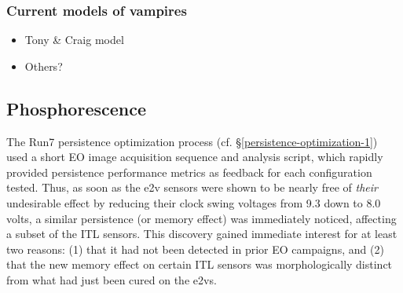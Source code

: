 \subsubsection{Current models of
vampires}\label{current-models-of-vampires}

\begin{itemize}
\tightlist
\item
  Tony \& Craig model
\item
  Others?
\end{itemize}



\subsection{Phosphorescence}\label{phosphorescence}

The Run7 persistence optimization process (cf. \S\ref{persistence-optimization-1}) used a short EO image acquisition sequence and analysis script, which rapidly provided persistence performance metrics as feedback for each configuration tested. Thus, as soon as the e2v sensors were shown to be nearly free of {\it their} undesirable effect by reducing their clock swing voltages from 9.3 down to 8.0 volts, a similar persistence (or memory effect) was immediately noticed, affecting a subset of the ITL sensors. This discovery gained immediate interest for at least two reasons: (1) that it had not been detected in prior EO campaigns, and (2) that the new memory effect on certain ITL sensors was morphologically distinct from what had just been cured on the e2vs. 

